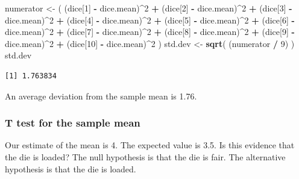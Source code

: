 \documentclass[]{article}
\newenvironment{Shaded}{\begin{snugshade}}{\end{snugshade}}
\newcommand{\KeywordTok}[1]{\textcolor[rgb]{0.13,0.29,0.53}{\textbf{#1}}}
\newcommand{\DecValTok}[1]{\textcolor[rgb]{0.00,0.00,0.81}{#1}}
\newcommand{\StringTok}[1]{\textcolor[rgb]{0.31,0.60,0.02}{#1}}
\newcommand{\OperatorTok}[1]{\textcolor[rgb]{0.81,0.36,0.00}{\textbf{#1}}}
\newcommand{\NormalTok}[1]{#1}
\theoremstyle{definition}
\theoremstyle{definition}
\theoremstyle{definition}
\theoremstyle{remark}
\begin{document}
\begin{Shaded}
\begin{Highlighting}[]
\NormalTok{numerator <-}\StringTok{ }\NormalTok{( (dice[}\DecValTok{1}\NormalTok{] }\OperatorTok{-}\StringTok{ }\NormalTok{dice.mean)}\OperatorTok{^}\DecValTok{2} \OperatorTok{+}\StringTok{ }\NormalTok{(dice[}\DecValTok{2}\NormalTok{] }\OperatorTok{-}\StringTok{ }\NormalTok{dice.mean)}\OperatorTok{^}\DecValTok{2} \OperatorTok{+}\StringTok{ }\NormalTok{(dice[}\DecValTok{3}\NormalTok{] }\OperatorTok{-}\StringTok{ }\NormalTok{dice.mean)}\OperatorTok{^}\DecValTok{2}  \OperatorTok{+}
\StringTok{                 }\NormalTok{(dice[}\DecValTok{4}\NormalTok{] }\OperatorTok{-}\StringTok{ }\NormalTok{dice.mean)}\OperatorTok{^}\DecValTok{2} \OperatorTok{+}\StringTok{ }\NormalTok{(dice[}\DecValTok{5}\NormalTok{] }\OperatorTok{-}\StringTok{ }\NormalTok{dice.mean)}\OperatorTok{^}\DecValTok{2} \OperatorTok{+}\StringTok{ }\NormalTok{(dice[}\DecValTok{6}\NormalTok{] }\OperatorTok{-}\StringTok{ }\NormalTok{dice.mean)}\OperatorTok{^}\DecValTok{2} \OperatorTok{+}
\StringTok{                 }\NormalTok{(dice[}\DecValTok{7}\NormalTok{] }\OperatorTok{-}\StringTok{ }\NormalTok{dice.mean)}\OperatorTok{^}\DecValTok{2} \OperatorTok{+}\StringTok{ }\NormalTok{(dice[}\DecValTok{8}\NormalTok{] }\OperatorTok{-}\StringTok{ }\NormalTok{dice.mean)}\OperatorTok{^}\DecValTok{2} \OperatorTok{+}\StringTok{ }\NormalTok{(dice[}\DecValTok{9}\NormalTok{] }\OperatorTok{-}\StringTok{ }\NormalTok{dice.mean)}\OperatorTok{^}\DecValTok{2} \OperatorTok{+}
\StringTok{                 }\NormalTok{(dice[}\DecValTok{10}\NormalTok{] }\OperatorTok{-}\StringTok{ }\NormalTok{dice.mean)}\OperatorTok{^}\DecValTok{2}\NormalTok{ )}
\NormalTok{std.dev <-}\StringTok{ }\KeywordTok{sqrt}\NormalTok{( (numerator }\OperatorTok{/}\StringTok{ }\DecValTok{9}\NormalTok{) )}
\NormalTok{std.dev}
\end{Highlighting}
\end{Shaded}

\begin{verbatim}
[1] 1.763834
\end{verbatim}

An average deviation from the sample mean is 1.76.

\subsubsection{T test for the sample
mean}\label{t-test-for-the-sample-mean}

Our estimate of the mean is 4. The expected value is 3.5. Is this
evidence that the die is loaded? The null hypothesis is that the die is
fair. The alternative hypothesis is that the die is loaded.
\end{document}
